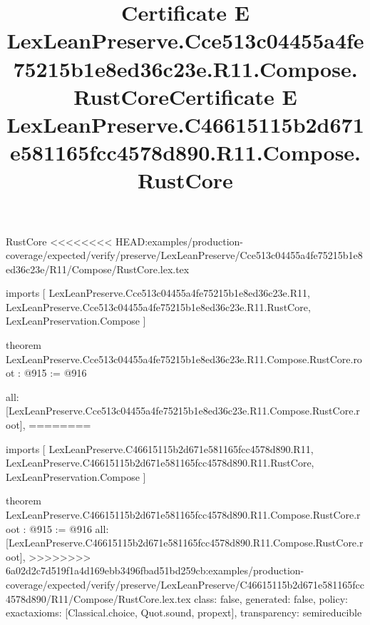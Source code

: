 \begin{lexlean}{RustCore}
<<<<<<<< HEAD:examples/production-coverage/expected/verify/preserve/LexLeanPreserve/Cce513c04455a4fe75215b1e8ed36c23e/R11/Compose/RustCore.lex.tex
\title{Certificate E LexLeanPreserve.Cce513c04455a4fe75215b1e8ed36c23e.R11.Compose.RustCore}
\begin{coremodule}
imports [
  LexLeanPreserve.Cce513c04455a4fe75215b1e8ed36c23e.R11,
  LexLeanPreserve.Cce513c04455a4fe75215b1e8ed36c23e.R11.RustCore,
  LexLeanPreservation.Compose
]

theorem LexLeanPreserve.Cce513c04455a4fe75215b1e8ed36c23e.R11.Compose.RustCore.root : @915 := @916 {
  all: [LexLeanPreserve.Cce513c04455a4fe75215b1e8ed36c23e.R11.Compose.RustCore.root],
========
\title{Certificate E LexLeanPreserve.C46615115b2d671e581165fcc4578d890.R11.Compose.RustCore}
\begin{coremodule}
imports [
  LexLeanPreserve.C46615115b2d671e581165fcc4578d890.R11,
  LexLeanPreserve.C46615115b2d671e581165fcc4578d890.R11.RustCore,
  LexLeanPreservation.Compose
]

theorem LexLeanPreserve.C46615115b2d671e581165fcc4578d890.R11.Compose.RustCore.root : @915 := @916 {
  all: [LexLeanPreserve.C46615115b2d671e581165fcc4578d890.R11.Compose.RustCore.root],
>>>>>>>> 6a02d2c7d519f1a4d169ebb3496fbad51bd259cb:examples/production-coverage/expected/verify/preserve/LexLeanPreserve/C46615115b2d671e581165fcc4578d890/R11/Compose/RustCore.lex.tex
  class: false,
  generated: false,
  policy: exact{axioms: [Classical.choice, Quot.sound, propext]},
  transparency: semireducible
}


\end{coremodule}}
\end{coremodule}
\end{lexlean}
